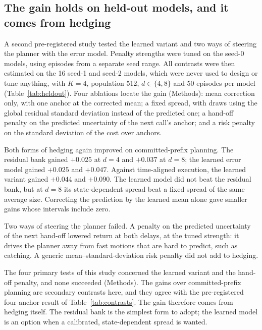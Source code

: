 \documentclass[pdflatex,sn-nature]{sn-jnl}%
\begin{document}
\subsection{The gain holds on held-out models, and it comes from hedging}\label{sec:heldout}

A second pre-registered study tested the learned variant and two ways of steering the planner with the error model. Penalty strengths were tuned on the seed-0 models, using episodes from a separate seed range. All contrasts were then estimated on the 16 seed-1 and seed-2 models, which were never used to design or tune anything, with $K=4$, population 512, $d\in\{4,8\}$ and 50 episodes per model (Table~\ref{tab:heldout}). Four ablations locate the gain (Methods): mean correction only, with one anchor at the corrected mean; a fixed spread, with draws using the global residual standard deviation instead of the predicted one; a hand-off penalty on the predicted uncertainty of the next call's anchor; and a risk penalty on the standard deviation of the cost over anchors.

Both forms of hedging again improved on committed-prefix planning. The residual bank gained $+0.025$ at $d=4$ and $+0.037$ at $d=8$; the learned error model gained $+0.025$ and $+0.047$. Against time-aligned execution, the learned variant gained $+0.044$ and $+0.090$. The learned model did not beat the residual bank, but at $d=8$ its state-dependent spread beat a fixed spread of the same average size. Correcting the prediction by the learned mean alone gave smaller gains whose intervals include zero.

Two ways of steering the planner failed. A penalty on the predicted uncertainty of the next hand-off lowered return at both delays, at the tuned strength: it drives the planner away from fast motions that are hard to predict, such as catching. A generic mean--standard-deviation risk penalty did not add to hedging.

The four primary tests of this study concerned the learned variant and the hand-off penalty, and none succeeded (Methods). The gains over committed-prefix planning are secondary contrasts here, and they agree with the pre-registered four-anchor result of Table~\ref{tab:contrasts}. The gain therefore comes from hedging itself. The residual bank is the simplest form to adopt; the learned model is an option when a calibrated, state-dependent spread is wanted.
\end{document}
